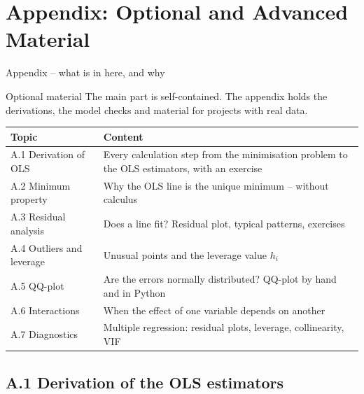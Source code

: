 \documentclass[aspectratio=169,11pt]{beamer}
\newcommand{\overviewleft}{1-3}
\begin{document}
\appendix
\let\overviewleft\undefined
\section[Appendix]{Appendix: Optional and Advanced Material}

\begin{frame}{Appendix -- what is in here, and why}
  \begin{block}{Optional material}
    The main part is self-contained. The appendix holds the derivations, the
    model checks and material for projects with real data.
  \end{block}
  \begin{center}
    \small
    \renewcommand{\arraystretch}{1.05}
    \begin{tabular}{@{}l>{\raggedright\arraybackslash}p{9.4cm}@{}}
      \toprule
      \textbf{Topic} & \textbf{Content}\\
      \midrule
      A.1 Derivation of OLS & Every calculation step from the minimisation
        problem to the OLS estimators, with an exercise\\
      A.2 Minimum property & Why the OLS line is the unique minimum -- without calculus\\
      A.3 Residual analysis & Does a line fit? Residual plot, typical patterns, exercises\\
      A.4 Outliers and leverage & Unusual points and the leverage value $h_i$\\
      A.5 QQ-plot & Are the errors normally distributed? QQ-plot by hand and in Python\\
      A.6 Interactions & When the effect of one variable depends on another\\
      A.7 Diagnostics & Multiple regression: residual plots, leverage, collinearity, VIF\\
      \bottomrule
    \end{tabular}
  \end{center}
\end{frame}

\subsection{A.1 Derivation of the OLS estimators}
\end{document}
